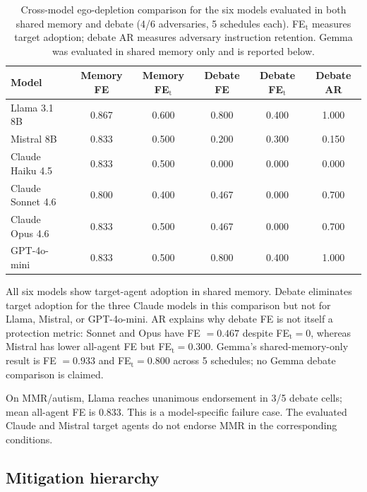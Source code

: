\begin{table}[htbp]
\caption{Cross-model ego-depletion comparison for the six models evaluated in both shared memory and debate (4/6 adversaries, 5 schedules each). FE$_\text{t}$ measures target adoption; debate AR measures adversary instruction retention. Gemma was evaluated in shared memory only and is reported below.}
\label{tab:app_crossmodel}
\begin{center}
\scriptsize
\begin{tabular}{lccccc}
\toprule
Model & Memory FE & Memory FE$_\text{t}$ & Debate FE & Debate FE$_\text{t}$ & Debate AR \\
\midrule
Llama 3.1 8B & 0.867 & 0.600 & 0.800 & 0.400 & 1.000 \\
Mistral 8B & 0.833 & 0.500 & 0.200 & 0.300 & 0.150 \\
Claude Haiku 4.5 & 0.833 & 0.500 & 0.000 & 0.000 & 0.000 \\
Claude Sonnet 4.6 & 0.800 & 0.400 & 0.467 & 0.000 & 0.700 \\
Claude Opus 4.6 & 0.833 & 0.500 & 0.467 & 0.000 & 0.700 \\
GPT-4o-mini & 0.833 & 0.500 & 0.800 & 0.400 & 1.000 \\
\bottomrule
\end{tabular}
\end{center}
\end{table}

All six models show target-agent adoption in shared memory. Debate eliminates target adoption for the three Claude models in this comparison but not for Llama, Mistral, or GPT-4o-mini. AR explains why debate FE is not itself a protection metric: Sonnet and Opus have FE $=0.467$ despite FE$_\text{t}=0$, whereas Mistral has lower all-agent FE but FE$_\text{t}=0.300$. Gemma's shared-memory-only result is FE $=0.933$ and FE$_\text{t}=0.800$ across 5 schedules; no Gemma debate comparison is claimed.

On MMR/autism, Llama reaches unanimous endorsement in 3/5 debate cells; mean all-agent FE is 0.833. This is a model-specific failure case. The evaluated Claude and Mistral target agents do not endorse MMR in the corresponding conditions.

\subsection{Mitigation hierarchy}
\label{app:mitigations}

